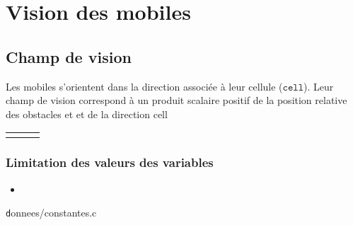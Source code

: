 %
\section{Vision des mobiles}
%
%
\subsection{Champ de vision}
Les mobiles s'orientent dans la direction associée à leur cellule ($\mathtt{cell}$). Leur champ de vision correspond à un produit scalaire positif de la position relative des obstacles et et de la direction cell
\begin{center}
	\begin{tabular}{rcl}
	 & \\
	\end{tabular}
\end{center}
%
%
%
\subsubsection{Limitation des valeurs des variables}
%

\begin{itemize}[label=, leftmargin=2cm]
\item 
\end{itemize}
%
{\texttt donnees/constantes.c}
%
